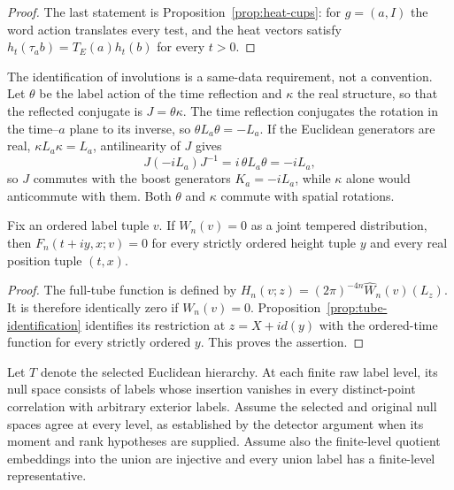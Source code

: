 \begin{proof}
The last statement is Proposition~\ref{prop:heat-cups}: for $g=(a,I)$
the word action translates every test, and the heat vectors satisfy
$h_t(\tau_ab)=T_E(a)h_t(b)$ for every $t>0$.
\end{proof}

The identification of involutions is a same-data requirement, not a
convention. Let $\theta$ be the label action of the time reflection and
$\kappa$ the real structure, so that the reflected conjugate is
$J=\theta\kappa$. The time reflection conjugates the rotation in the
time--$a$ plane to its inverse, so $\theta L_a\theta=-L_a$. If the
Euclidean generators are real, $\kappa L_a\kappa=L_a$, antilinearity of
$J$ gives
\[
 J(-iL_a)J^{-1}=i\,\theta L_a\theta=-iL_a,
\]
so $J$ commutes with the boost generators $K_a=-iL_a$, while $\kappa$ alone
would anticommute with them. Both $\theta$ and $\kappa$ commute with spatial
rotations.

\begin{lemma}
\label{lem:zero-boundary}
Fix an ordered label tuple $v$. If $W_n(v)=0$ as a joint tempered
distribution, then $F_n(t+iy,x;v)=0$ for every strictly ordered height tuple
$y$ and every real position tuple $(t,x)$.
\end{lemma}
\begin{proof}
The full-tube function is defined by
$H_n(v;z)=(2\pi)^{-4n}\widehat W_n(v)(L_z)$.
It is therefore identically zero if $W_n(v)=0$. Proposition~\ref{prop:tube-identification}
identifies its restriction at $z=X+i d(y)$ with the ordered-time function
for every strictly ordered $y$. This proves the assertion.
\end{proof}

Let $T$ denote the selected Euclidean hierarchy. At each finite raw label
level, its null space consists of labels whose insertion vanishes in every
distinct-point correlation with arbitrary exterior labels. Assume the
selected and original null spaces agree at every level, as established by
the detector argument when its moment and rank hypotheses are supplied.
Assume also the finite-level quotient embeddings into the union are
injective and every union label has a finite-level representative.

